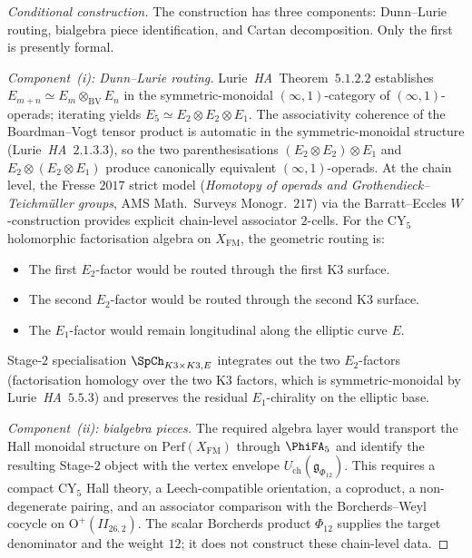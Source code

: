 \begin{proof}[Conditional construction]
The construction has three components: Dunn--Lurie routing, bialgebra piece identification, and Cartan decomposition. Only the first is presently formal.

\emph{Component~(i): Dunn--Lurie routing.}
Lurie~\textit{HA}~Theorem~$5.1.2.2$ establishes $E_{m+n} \simeq E_m \otimes_{\mathrm{BV}} E_n$ in the symmetric-monoidal $(\infty, 1)$-category of $(\infty, 1)$-operads; iterating yields $E_5 \simeq E_2 \otimes E_2 \otimes E_1$. The associativity coherence of the Boardman--Vogt tensor product is automatic in the symmetric-monoidal structure (Lurie~\textit{HA}~$2.1.3.3$), so the two parenthesisations $(E_2 \otimes E_2) \otimes E_1$ and $E_2 \otimes (E_2 \otimes E_1)$ produce canonically equivalent $(\infty, 1)$-operads. At the chain level, the Fresse $2017$ strict model (\emph{Homotopy of operads and Grothendieck--Teichm\"uller groups}, AMS Math.\ Surveys Monogr.~$217$) via the Barratt--Eccles $W$-construction provides explicit chain-level associator $2$-cells. For the CY$_5$ holomorphic factorisation algebra on $X_{\mathrm{FM}}$, the geometric routing is:
\begin{itemize}
\item The first $E_2$-factor would be routed through the first K3 surface.
\item The second $E_2$-factor would be routed through the second K3 surface.
\item The $E_1$-factor would remain longitudinal along the elliptic curve $E$.
\end{itemize}
Stage-$2$ specialisation $\SpCh_{K3 \times K3, E}$ integrates out the two $E_2$-factors (factorisation homology over the two K3 factors, which is symmetric-monoidal by Lurie~\textit{HA}~$5.5.3$) and preserves the residual $E_1$-chirality on the elliptic base.

\emph{Component~(ii): bialgebra pieces.}
The required algebra layer would transport the Hall monoidal structure
on \(\mathrm{Perf}(X_{\mathrm{FM}})\) through \(\PhiFA_5\) and identify
the resulting Stage-$2$ object with the vertex envelope
\(U_{\mathrm{ch}}(\mathfrak{g}_{\Phi_{12}})\). This requires a compact
CY$_5$ Hall theory, a Leech-compatible orientation, a coproduct, a
non-degenerate pairing, and an associator comparison with the
Borcherds--Weyl cocycle on \(\mathrm{O}^+(II_{26,2})\). The scalar
Borcherds product \(\Phi_{12}\) supplies the target denominator and the
weight \(12\); it does not construct these chain-level data.


\end{proof}
